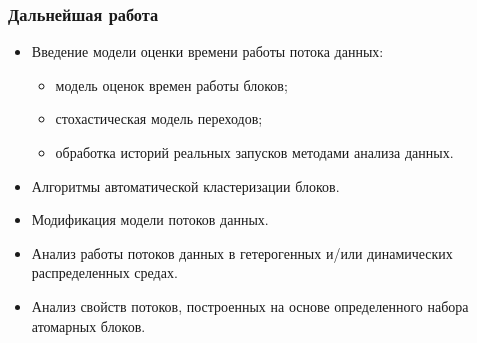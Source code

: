 \documentclass[10pt,pdf,hyperref={unicode}]{beamer}
\begin{document}
\begin{frame}
  \frametitle{Дальнейшая работа}
  \begin{itemize}
    \item Введение модели оценки времени работы потока данных:
    \begin{itemize}
      \item модель оценок времен работы блоков;
      \item стохастическая модель переходов;
      \item обработка историй реальных запусков методами анализа данных.
    \end{itemize}
    \item Алгоритмы автоматической кластеризации блоков.
    \item Модификация модели потоков данных.
    \item Анализ работы потоков данных в гетерогенных и/или динамических распределенных средах.
    \item Анализ свойств потоков, построенных на основе определенного набора атомарных блоков.
  \end{itemize}
\end{frame}
\end{document}
